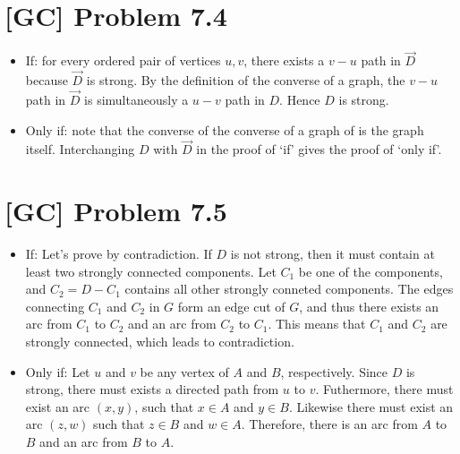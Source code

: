 \documentclass[a4paper,11pt,twocolumn]{article}
\begin{document}
  \section{[GC] Problem 7.4}
  \begin{itemize}
  	\item If: for every ordered pair of vertices $u, v$, there exists a $v-u$ path in $\vec{D}$ because $\vec{D}$ is strong. By the definition of the converse of a graph, the $v-u$ path in $\vec{D}$ is simultaneously a $u-v$ path in $D$. Hence $D$ is strong.
  	\item Only if: note that the converse of the converse of a graph of is the graph itself. Interchanging $D$ with $\vec{D}$ in the proof of `if' gives the proof of `only if'.
  \end{itemize}
  
  \section{[GC] Problem 7.5}
  \begin{itemize}
  	\item If: Let's prove by contradiction. If $D$ is not strong, then it must contain at least two strongly connected components. Let $C_1$ be one of the components, and $C_2 = D - C_1$ contains all other strongly conneted components. The edges connecting $C_1$ and $C_2$ in $G$ form an edge cut of $G$, and thus there exists an arc from $C_1$ to $C_2$ and an arc from $C_2$ to $C_1$. This means that $C_1$ and $C_2$ are  strongly connected, which leads to contradiction.
  	\item Only if: Let $u$ and $v$ be any vertex of $A$ and $B$, respectively. Since $D$ is strong, there must exists a directed path from $u$ to $v$. Futhermore, there must exist an arc $(x, y)$, such that $x \in A$ and $y \in B$. Likewise there must exist an arc $(z, w)$ such that $z \in B$ and $w \in A$. Therefore, there is an arc from $A$ to $B$ and an arc from $B$ to $A$.
  \end{itemize}
  
\end{document}
